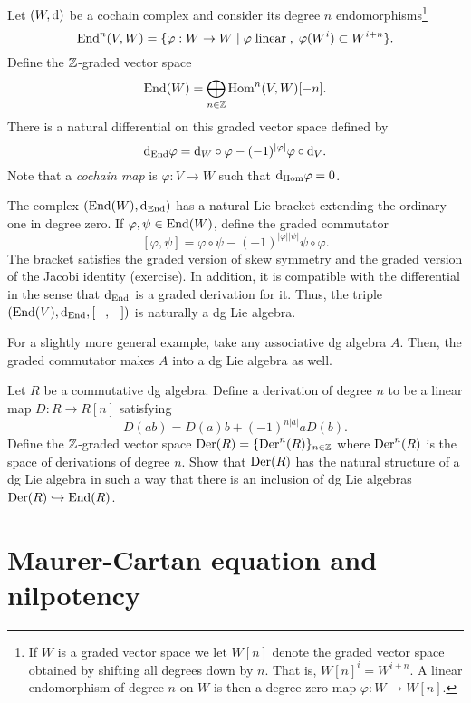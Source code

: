 \documentclass[11pt]{amsart}
\begin{document}
\begin{eg}
Let $(W, {\rm d})$ be a cochain complex and consider its degree $n$ endomorphisms\footnote{If $W$ is a graded vector space we let $W[n]$ denote the graded vector space obtained by shifting all degrees down by $n$.
That is, $W[n]^i = W^{i+n}$. 
A linear endomorphism of degree $n$ on $W$ is then a degree zero map $\varphi : W \to W[n]$.}
\[
{\rm End}^n (V,W) = \{\varphi : W \to W \; | \; \varphi \; {\rm linear} \; , \; \varphi(W^i) \subset W^{i+n} \} .
\]
Define the $\mathbb Z$-graded vector space
\[
{\rm End}(W) = \bigoplus_{n \in \mathbb Z} {\rm Hom}^n(V,W)[-n] .
\] 
There is a natural differential on this graded vector space defined by
\[
{\rm d}_{\rm End} \varphi = {\rm d}_W \circ \varphi -  (-1)^{|\varphi|} \varphi \circ {\rm d}_V .
\]
Note that a {\em cochain map} is $\varphi : V \to W$ such that ${\rm d}_{\rm Hom} \varphi = 0$. 

The complex $({\rm End}(W), {\rm d}_{\rm End})$ has a natural Lie bracket extending the ordinary one in degree zero. 
If $\varphi, \psi \in {\rm End}(W)$, define the graded commutator
\[
[\varphi, \psi] = \varphi \circ \psi - (-1)^{|\varphi| |\psi|} \psi \circ \varphi .
\] 
The bracket satisfies the graded version of skew symmetry and the graded version of the Jacobi identity (exercise). 
In addition, it is compatible with the differential in the sense that ${\rm d}_{{\rm End}}$ is a graded derivation for it. 
Thus, the triple $({\rm End}(V), {\rm d}_{{\rm End}}, [-,-])$ is naturally a dg Lie algebra.
\end{eg}

\begin{eg}
For a slightly more general example, take any associative dg algebra $A$. 
Then, the graded commutator makes $A$ into a dg Lie algebra as well.
\end{eg}

\begin{ex}
Let $R$ be a commutative dg algebra. 
Define a derivation of degree $n$ to be a linear map $D : R \to R[n]$ satisfying
\[
D(ab) = D(a) b + (-1)^{n|a|} a D(b) .
\] 
Define the $\mathbb Z$-graded vector space ${\rm Der}(R) = \{{\rm Der}^n(R)\}_{n \in \mathbb Z}$ where ${\rm Der}^n(R)$ is the space of derivations of degree $n$.
Show that ${\rm Der}(R)$ has the natural structure of a dg Lie algebra in such a way that there is an inclusion of dg Lie algebras ${\rm Der}(R) \hookrightarrow {\rm End}(R)$.
\end{ex}

\section{Maurer-Cartan equation and nilpotency}
\end{document}
